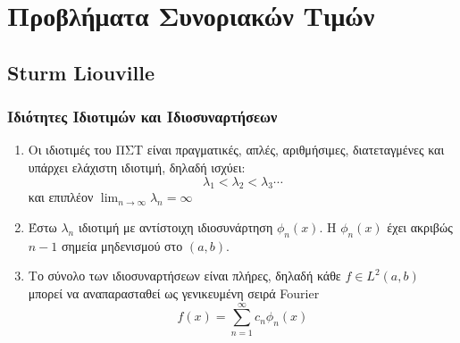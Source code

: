 



\geometry{top=1cm}

\pagestyle{vangelis}
\everymath{\displaystyle}
\setcounter{chapter}{1}



\chapter*{Προβλήματα Συνοριακών Τιμών}

\section*{Sturm Liouville}

\subsection*{Ιδιότητες Ιδιοτιμών και Ιδιοσυναρτήσεων}

\begin{enumerate}
  \item Οι ιδιοτιμές του ΠΣΤ είναι πραγματικές, απλές, αριθμήσιμες, διατεταγμένες και 
    υπάρχει ελάχιστη ιδιοτιμή, δηλαδή ισχύει:
    \[
      \lambda _{1} < \lambda _{2} < \lambda _{3} \cdots 
     \]
     και επιπλέον $ \lim_{n \to \infty} \lambda _{n} = \infty $

   \item Έστω $ \lambda _{n} $ ιδιοτιμή με αντίστοιχη ιδιοσυνάρτηση $ \phi _{n}(x) $. 
     Η $ \phi _{n}(x) $ έχει ακριβώς $ n-1 $ σημεία μηδενισμού στο $ (a,b) $.

   \item Το σύνολο των ιδιοσυναρτήσεων είναι πλήρες, δηλαδή κάθε $ f \in L^{2}(a,b) $ 
     μπορεί να αναπαρασταθεί ως γενικευμένη σειρά Fourier 
     \[
       f(x) = \sum_{n=1}^{\infty} c_{n} \phi _{n}(x) 
      \] 



     
\end{enumerate}


